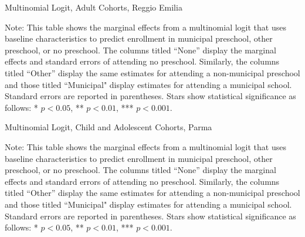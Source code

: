 \begin{table}[H]
\centering
\caption{Multinomial Logit, Adult Cohorts, Reggio Emilia} \label{mlogit-adult-RE}
\begin{adjustbox}{width=\textwidth}
\begin{threeparttable}

\begin{tablenotes}
\footnotesize\raggedright{Note: This table shows the marginal effects from a multinomial logit that uses baseline characteristics to predict enrollment in municipal preschool, other preschool, or no preschool. The columns titled ``None'' display the marginal effects and standard errors of attending no preschool. Similarly, the columns titled ``Other'' display the same estimates for attending a non-municipal preschool and those titled ``Municipal" display estimates for attending a municipal school. Standard errors are reported in parentheses. Stars show statistical significance as follows: * $p < 0.05$, ** $p < 0.01$, *** $p < 0.001$.}
\end{tablenotes}
\end{threeparttable}
\end{adjustbox}
\end{table}

\begin{table}[H]
\centering
\caption{Multinomial Logit, Child and Adolescent Cohorts, Parma} \label{mlogit-chi-ado-PR}
\begin{adjustbox}{width=\textwidth}
\begin{threeparttable}

\begin{tablenotes}
\footnotesize\raggedright{Note: This table shows the marginal effects from a multinomial logit that uses baseline characteristics to predict enrollment in municipal preschool, other preschool, or no preschool. The columns titled ``None'' display the marginal effects and standard errors of attending no preschool. Similarly, the columns titled ``Other'' display the same estimates for attending a non-municipal preschool and those titled ``Municipal" display estimates for attending a municipal school. Standard errors are reported in parentheses. Stars show statistical significance as follows: * $p < 0.05$, ** $p < 0.01$, *** $p < 0.001$.}
\end{tablenotes}
\end{threeparttable}
\end{adjustbox}
\end{table}


